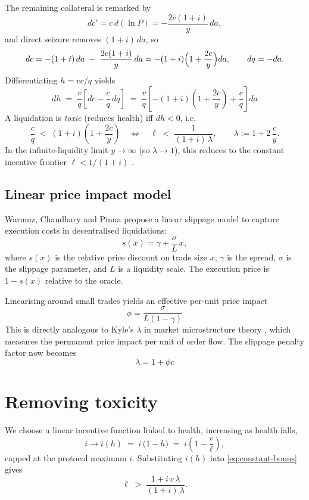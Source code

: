 \documentclass[11pt]{article}
\begin{document}
The remaining collateral is remarked by
\[
dc' = c\,d(\ln P) = -\frac{2c(1+i)}{y}\,da,
\]
and direct seizure removes \((1+i)\,da\), so
\[
dc = - (1+i)\,da \;-\; \frac{2c(1+i)}{y}\,da
= -(1+i)\Bigl(1+\frac{2c}{y}\Bigr)da,
\qquad dq=-da.
\]
Differentiating \(h = v c/q\) yields
\[
dh \;=\; \frac{v}{q}\!\left[dc - \frac{c}{q}\,dq\right]
\;=\; \frac{v}{q}\!\left[-(1+i)\!\left(1+\frac{2c}{y}\right) + \frac{c}{q}\right]\!da
\]
A liquidation is \emph{toxic} (reduces health) iff \(dh<0\), i.e.
\begin{equation}
\frac{c}{q} \;<\; (1+i)\!\left(1+\frac{2c}{y}\right)
\quad\Longleftrightarrow\quad
\ell \;<\; \frac{1}{(1+i)\,\lambda},
\qquad
\lambda := 1 + 2\,\frac{c}{y}.
\label{eq:constant-bonus}
\end{equation}
In the infinite-liquidity limit \(y\to\infty\) (so \(\lambda\to 1\)), this reduces to the constant incentive frontier \(\ell < 1/(1+i)\) \cite{WCP2022}.

\subsection{Linear price impact model}
Warmuz, Chaudhary and Pinna \cite{WCP2022} propose a linear slippage model to capture execution costs in decentralised liquidations:
\[
s(x) = \gamma + \frac{\sigma}{L}\,x,
\]
where $s(x)$ is the relative price discount on trade size $x$, $\gamma$ is the spread, $\sigma$ is the slippage parameter, and $L$ is a liquidity scale. The execution price is $1-s(x)$ relative to the oracle.

Linearising around small trades yields an effective per-unit price impact
\[
\phi = \frac{\sigma}{L(1-\gamma)}
\]
This is directly analogous to Kyle’s $\lambda$ in market microstructure theory \cite{Kyle1985}, which measures the permanent price impact per unit of order flow. The slippage penalty factor now becomes
\[
\lambda = 1 + \phi c
\]

\section{Removing toxicity}
We choose a linear incentive function linked to health, increasing as health falls,
\[
i \to i(h) \;=\; i\,\bigl(1-h\bigr)
\;=\; i\!\left(1 - \frac{v}{\ell}\right),
\]
capped at the protocol maximum \(i\). Substituting \(i(h)\) into \eqref{eq:constant-bonus} gives
\begin{equation}
\ell \;>\; \frac{1 + i\,v\,\lambda}{(1+i)\,\lambda}.
\label{eq:euler-dutch}
\end{equation}
\end{document}
